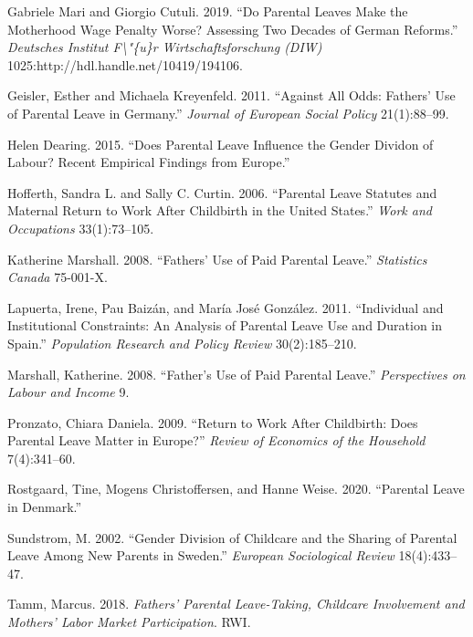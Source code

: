 \documentclass[
  12pt,
]{article}
\begin{document}
\leavevmode\hypertarget{ref-gabriele_mari_parental_2019}{}%
Gabriele Mari and Giorgio Cutuli. 2019. ``Do Parental Leaves Make the Motherhood Wage Penalty Worse? Assessing Two Decades of German Reforms.'' \emph{Deutsches Institut F\textbackslash"\{u\}r Wirtschaftsforschung (DIW)} 1025:http://hdl.handle.net/10419/194106.

\leavevmode\hypertarget{ref-geisler_against_2011}{}%
Geisler, Esther and Michaela Kreyenfeld. 2011. ``Against All Odds: Fathers' Use of Parental Leave in Germany.'' \emph{Journal of European Social Policy} 21(1):88--99.

\leavevmode\hypertarget{ref-helen_dearing_does_2015}{}%
Helen Dearing. 2015. ``Does Parental Leave Influence the Gender Dividon of Labour? Recent Empirical Findings from Europe.''

\leavevmode\hypertarget{ref-hofferth_parental_2006}{}%
Hofferth, Sandra L. and Sally C. Curtin. 2006. ``Parental Leave Statutes and Maternal Return to Work After Childbirth in the United States.'' \emph{Work and Occupations} 33(1):73--105.

\leavevmode\hypertarget{ref-katherine_marshall_fathers_2008}{}%
Katherine Marshall. 2008. ``Fathers' Use of Paid Parental Leave.'' \emph{Statistics Canada} 75-001-X.

\leavevmode\hypertarget{ref-lapuerta_individual_2011}{}%
Lapuerta, Irene, Pau Baizán, and María José González. 2011. ``Individual and Institutional Constraints: An Analysis of Parental Leave Use and Duration in Spain.'' \emph{Population Research and Policy Review} 30(2):185--210.

\leavevmode\hypertarget{ref-marshall_fathers_2008}{}%
Marshall, Katherine. 2008. ``Father's Use of Paid Parental Leave.'' \emph{Perspectives on Labour and Income} 9.

\leavevmode\hypertarget{ref-pronzato_return_2009}{}%
Pronzato, Chiara Daniela. 2009. ``Return to Work After Childbirth: Does Parental Leave Matter in Europe?'' \emph{Review of Economics of the Household} 7(4):341--60.

\leavevmode\hypertarget{ref-rostgaard_parental_2020}{}%
Rostgaard, Tine, Mogens Christoffersen, and Hanne Weise. 2020. ``Parental Leave in Denmark.''

\leavevmode\hypertarget{ref-sundstrom_gender_2002}{}%
Sundstrom, M. 2002. ``Gender Division of Childcare and the Sharing of Parental Leave Among New Parents in Sweden.'' \emph{European Sociological Review} 18(4):433--47.

\leavevmode\hypertarget{ref-tamm_fathers_2018}{}%
Tamm, Marcus. 2018. \emph{Fathers' Parental Leave-Taking, Childcare Involvement and Mothers' Labor Market Participation}. RWI.
\end{document}
